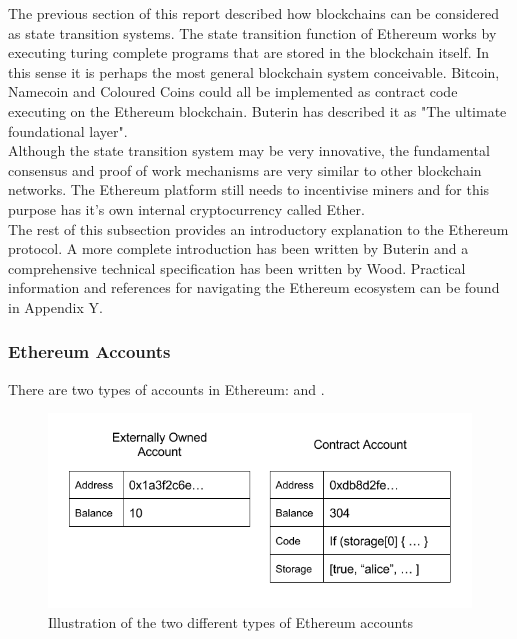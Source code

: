 The previous section of this report described how blockchains can be considered as state transition systems. The state transition function of Ethereum works by executing turing complete programs that are stored in the blockchain itself. In this sense it is perhaps the most general blockchain system conceivable. Bitcoin, Namecoin and Coloured Coins could all be implemented as contract code executing on the Ethereum blockchain. Buterin has described it as "The ultimate foundational layer"\cite{Ethereum}. \\

Although the state transition system may be very innovative, the fundamental consensus and proof of work mechanisms are very similar to other blockchain networks. The Ethereum platform still needs to incentivise miners and for this purpose has it's own internal cryptocurrency called Ether. \\

The rest of this subsection provides an introductory explanation to the Ethereum protocol. A more complete introduction has been written by Buterin\cite{Ethereum} and a comprehensive technical specification has been written by Wood\cite{wood2014ethereum}. Practical information and references for navigating the Ethereum ecosystem can be found in Appendix Y. \\

\subsubsection{Ethereum Accounts}
There are two types of accounts in Ethereum:  and . \\

\begin{figure}
\centering
\includegraphics[width=\textwidth]{Figures/ethereum_accounts}
\decoRule
\caption[Ethereum Accounts]{Illustration of the two different types of Ethereum accounts}
\label{fig:ethereum_accounts}
\end{figure}


